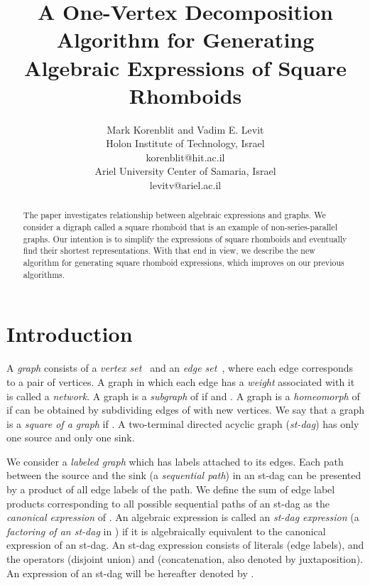 \documentclass[11pt]{article}\usepackage{amsmath}
\begin{document}
\author{Mark Korenblit  and Vadim E. Levit \bigskip\\ Holon Institute of Technology, Israel\\korenblit@hit.ac.il\\ Ariel University Center of Samaria, Israel\\levitv@ariel.ac.il }
\title{A One-Vertex Decomposition Algorithm for Generating Algebraic Expressions of
Square Rhomboids }
\date{}
\maketitle

\begin{abstract}
The paper investigates relationship between algebraic expressions and graphs.
We consider a digraph called a square rhomboid that is an example of
non-series-parallel graphs. Our intention is to simplify the expressions of
square rhomboids and eventually find their shortest representations. With that
end in view, we describe the new algorithm for generating square rhomboid
expressions, which improves on our previous algorithms.

\end{abstract}

\section{Introduction\label{intro}}

A \textit{graph } consists of a \textit{vertex set\ } and an
\textit{edge set\ }, where each edge corresponds to a pair  of
vertices. A graph in which each edge has a \textit{weight} associated with it
is called a \textit{network}. A graph  is
a \textit{subgraph} of  if  and . A graph  is a \textit{homeomorph} of  if  can
be obtained by subdividing edges of  with new vertices. We say
that a graph  is a \textit{square of a graph} 
if . A two-terminal directed acyclic
graph (\textit{st-dag}) has only one source and only one sink.

We consider a \textit{labeled graph} which has labels attached to its edges.
Each path between the source and the sink (a \textit{sequential path}) in an
st-dag can be presented by a product of all edge labels of the path. We define
the sum of edge label products corresponding to all possible sequential paths
of an st-dag  as the \textit{canonical expression }of . An algebraic
expression is called an \textit{st-dag expression} (a \textit{factoring of an
st-dag} in \cite{BKS}) if it is algebraically equivalent to the canonical
expression of an st-dag. An st-dag expression consists of literals (edge
labels), and the operators  (disjoint union) and  (concatenation,
also denoted by juxtaposition). An expression of an st-dag  will be
hereafter denoted by .
\end{document}
